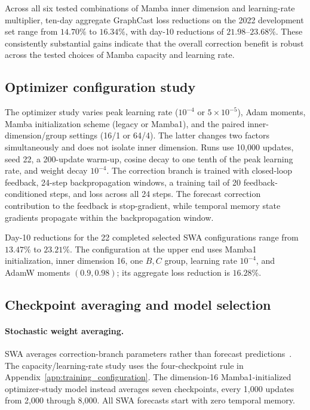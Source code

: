 \documentclass{article}
\newcommand{\vfourchange}[1]{{\color{blue}#1}}
\begin{document}
\vfourchange{Across all six tested combinations of Mamba inner dimension and learning-rate multiplier, ten-day aggregate GraphCast loss reductions on the 2022 development set range from $14.70\%$ to $16.34\%$, with day-10 reductions of $21.98$--$23.68\%$. These consistently substantial gains indicate that the overall correction benefit is robust across the tested choices of Mamba capacity and learning rate.}

\FloatBarrier
\subsection{\texorpdfstring{{Optimizer configuration study}}{Optimizer configuration study}}
\label{app:optimizer_study}
\vfourchange{{These optimizer comparisons use the 2022 development set.}}
The optimizer study varies peak learning rate ($10^{-4}$ or $5\times10^{-5}$), Adam moments, Mamba initialization scheme (legacy or Mamba1), and the paired inner-dimension/group settings (16/1 or 64/4). The latter changes two factors simultaneously and does not isolate inner dimension. Runs use 10,000 updates, seed 22, a 200-update warm-up, cosine decay to one tenth of the peak learning rate, and weight decay $10^{-4}$. {The correction branch is trained} with closed-loop feedback, 24-step backpropagation windows, a training tail of 20 feedback-conditioned steps, and loss across all 24 steps. {The forecast correction contribution to the feedback} is stop-gradient, while temporal memory state gradients propagate within the backpropagation window.

Day-10 reductions for the 22 completed selected SWA configurations range from $13.47\%$ to $23.21\%$. The configuration at the upper end uses Mamba1 initialization, inner dimension 16, one $B,C$ group, learning rate $10^{-4}$, and AdamW moments $(0.9,0.98)$; its aggregate loss reduction is $16.28\%$.

\subsection{\texorpdfstring{{Checkpoint averaging and model selection}}{Checkpoint averaging and model selection}}
\label{app:checkpoint_selection}
\begin{samepage}
\paragraph{Stochastic weight averaging.}
\vfourchange{SWA averages correction-branch parameters rather than forecast predictions~\citep{izmailov2019averagingweightsleadswider}. The capacity/learning-rate study uses the four-checkpoint rule in Appendix~\ref{app:training_configuration}. The dimension-16 Mamba1-initialized optimizer-study model instead averages seven checkpoints, every 1,000 updates from 2,000 through 8,000. All SWA forecasts start with zero temporal memory.}
\end{samepage}
\end{document}
